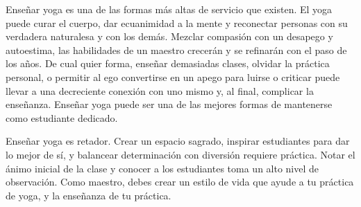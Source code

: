 Enseñar yoga es una de las formas más altas de servicio que existen. El yoga puede curar el cuerpo, dar ecuanimidad a la mente y reconectar personas con su verdadera naturalesa y con los demás. Mezclar compasión con un desapego y autoestima, las habilidades de un maestro crecerán y se refinarán con el paso de los años. De cual quier forma, enseñar demasiadas clases, olvidar la práctica personal, o permitir al ego convertirse en un apego para luirse o criticar puede llevar a una decreciente conexión con uno mismo y, al final, complicar la enseñanza. Enseñar yoga puede ser una de las mejores formas de mantenerse como estudiante dedicado.

Enseñar yoga es retador. Crear un espacio sagrado, inspirar estudiantes para dar lo mejor de sí, y balancear determinación con diversión requiere práctica. Notar el ánimo inicial de la clase y conocer a los estudiantes toma un alto nivel de observación. Como maestro, debes crear un estilo de vida que ayude a tu práctica de yoga, y la enseñanza de tu práctica.

